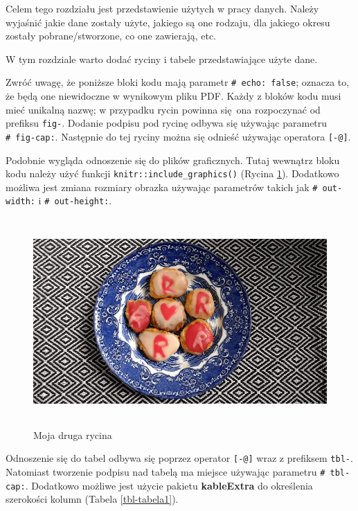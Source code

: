 \documentclass{amuthesis}
\begin{document}
Celem tego rozdziału jest przedstawienie użytych w pracy danych. Należy
wyjaśnić jakie dane zostały użyte, jakiego są one rodzaju, dla jakiego
okresu zostały pobrane/stworzone, co one zawierają, etc.

W tym rozdziale warto dodać ryciny i tabele przedstawiające użyte dane.

Zwróć uwagę, że poniższe bloki kodu mają parametr
\texttt{\#\textbar{}\ echo:\ false}; oznacza to, że będą one niewidoczne
w wynikowym pliku PDF. Każdy z bloków kodu musi mieć unikalną nazwę; w
przypadku rycin powinna się~ona rozpoczynać od prefiksu \texttt{fig-}.
Dodanie podpisu pod rycinę odbywa się używając parametru
\texttt{\#\textbar{}\ fig-cap:}. Następnie do tej ryciny można się
odnieść używając operatora \texttt{{[}-@{]}}.

Podobnie wygląda odnoszenie się do plików graficznych. Tutaj wewnątrz
bloku kodu należy użyć funkcji \texttt{knitr::include\_graphics()}
(Rycina \ref{fig-rycina2}). Dodatkowo możliwa jest zmiana rozmiary
obrazka używając parametrów takich jak \texttt{\#\textbar{}\ out-width:}
i \texttt{\#\textbar{}\ out-height:}.

\begin{figure}[t]

{\centering \includegraphics[width=1\textwidth,height=3.125in]{./figures/rcookies.png}

}

\caption{\label{fig-rycina2}Moja druga rycina}

\end{figure}

Odnoszenie się do tabel odbywa się poprzez operator \texttt{{[}-@{]}}
wraz z prefiksem \texttt{tbl-}. Natomiast tworzenie podpisu nad tabelą
ma miejsce używając parametru \texttt{\#\textbar{}\ tbl-cap:}. Dodatkowo
możliwe jest użycie pakietu \textbf{kableExtra} \autocite{R-kableExtra}
do określenia szerokości kolumn (Tabela \ref{tbl-tabela1}).
\end{document}
